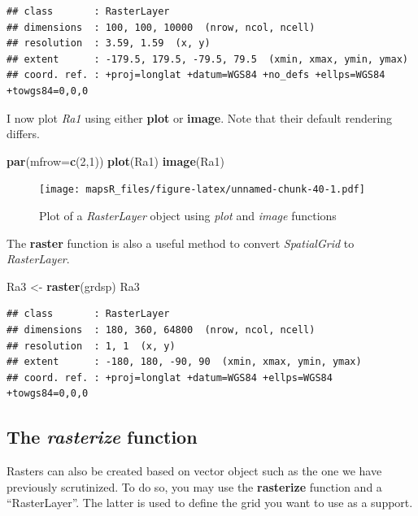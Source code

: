\documentclass[]{report}
\newenvironment{Shaded}{\begin{snugshade}}{\end{snugshade}}
\newcommand{\KeywordTok}[1]{\textcolor[rgb]{0.13,0.29,0.53}{\textbf{{#1}}}}
\newcommand{\DataTypeTok}[1]{\textcolor[rgb]{0.13,0.29,0.53}{{#1}}}
\newcommand{\DecValTok}[1]{\textcolor[rgb]{0.00,0.00,0.81}{{#1}}}
\newcommand{\StringTok}[1]{\textcolor[rgb]{0.31,0.60,0.02}{{#1}}}
\newcommand{\NormalTok}[1]{{#1}}
\begin{document}
\begin{verbatim}
## class       : RasterLayer 
## dimensions  : 100, 100, 10000  (nrow, ncol, ncell)
## resolution  : 3.59, 1.59  (x, y)
## extent      : -179.5, 179.5, -79.5, 79.5  (xmin, xmax, ymin, ymax)
## coord. ref. : +proj=longlat +datum=WGS84 +no_defs +ellps=WGS84 +towgs84=0,0,0
\end{verbatim}

I now plot \emph{Ra1} using either \textbf{plot} or \textbf{image}. Note
that their default rendering differs.

\begin{Shaded}
\begin{Highlighting}[]
\KeywordTok{par}\NormalTok{(}\DataTypeTok{mfrow=}\KeywordTok{c}\NormalTok{(}\DecValTok{2}\NormalTok{,}\DecValTok{1}\NormalTok{))}
\KeywordTok{plot}\NormalTok{(Ra1)}
\KeywordTok{image}\NormalTok{(Ra1)}
\end{Highlighting}
\end{Shaded}

\begin{figure}[htbp]
\centering
\texttt{[image: mapsR\_files/figure-latex/unnamed-chunk-40-1.pdf]}
\caption{Plot of a \emph{RasterLayer} object using \emph{plot} and
\emph{image} functions}
\end{figure}

The \textbf{raster} function is also a useful method to convert
\emph{SpatialGrid} to \emph{RasterLayer}.

\begin{Shaded}
\begin{Highlighting}[]
\NormalTok{Ra3 <-}\StringTok{ }\KeywordTok{raster}\NormalTok{(grdsp)}
\NormalTok{Ra3}
\end{Highlighting}
\end{Shaded}

\begin{verbatim}
## class       : RasterLayer 
## dimensions  : 180, 360, 64800  (nrow, ncol, ncell)
## resolution  : 1, 1  (x, y)
## extent      : -180, 180, -90, 90  (xmin, xmax, ymin, ymax)
## coord. ref. : +proj=longlat +datum=WGS84 +ellps=WGS84 +towgs84=0,0,0
\end{verbatim}

\subsection{\texorpdfstring{The \emph{rasterize}
function}{The rasterize function}}\label{the-rasterize-function}

Rasters can also be created based on vector object such as the one we
have previously scrutinized. To do so, you may use the
\textbf{rasterize} function and a ``RasterLayer''. The latter is used to
define the grid you want to use as a support.
\end{document}
